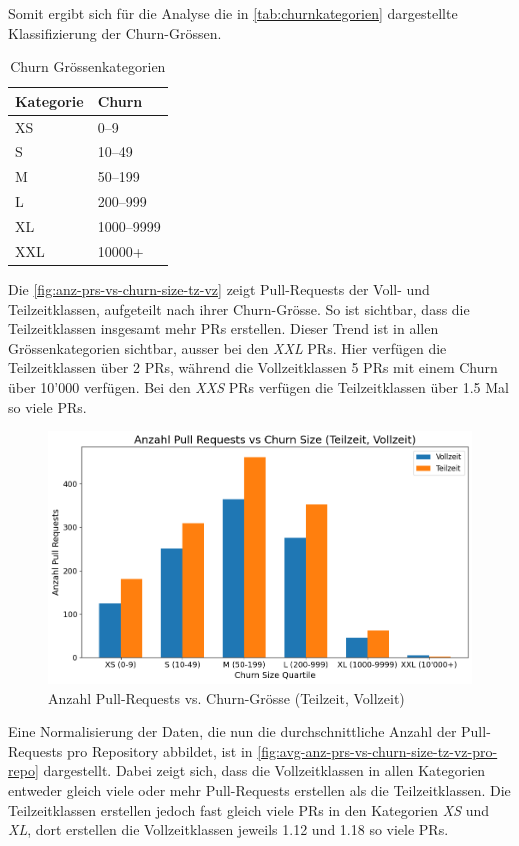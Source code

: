 \newpage
Somit ergibt sich für die Analyse die in \autoref{tab:churnkategorien} dargestellte Klassifizierung der Churn-Grössen.
\begin{table}[ht]
\caption{Churn Grössenkategorien}
\label{tab:churnkategorien}
\centering
\begin{tabular}{l l}
\toprule
\textbf{Kategorie} & \textbf{Churn} \\
\midrule
XS  & 0--9       \\
S        & 10--49     \\
M        & 50--199    \\
L         & 200--999   \\
XL   & 1000--9999 \\
XXL  & 10000+ \\
\bottomrule
\end{tabular}
\end{table}


Die \autoref{fig:anz-prs-vs-churn-size-tz-vz} zeigt Pull-Requests der Voll- und Teilzeitklassen, aufgeteilt nach ihrer Churn-Grösse. So ist sichtbar, dass die Teilzeitklassen insgesamt mehr PRs erstellen. Dieser Trend ist in allen Grössenkategorien sichtbar, ausser bei den \textit{XXL} PRs. Hier verfügen die Teilzeitklassen  über 2 PRs, während die Vollzeitklassen 5 PRs mit einem Churn über 10'000 verfügen. Bei den \textit{XXS} PRs verfügen die Teilzeitklassen über 1.5 Mal so viele PRs.

\begin{figure}[htbp]
    \includegraphics[width=\textwidth]{Figures/anz-prs-vs-churn-size-tz-vz.png}
    \caption{Anzahl Pull-Requests vs. Churn-Grösse (Teilzeit, Vollzeit)}
    \label{fig:anz-prs-vs-churn-size-tz-vz}
\end{figure}
\newpage
Eine Normalisierung der Daten, die nun die durchschnittliche Anzahl der Pull-Requests pro Repository abbildet, ist in \autoref{fig:avg-anz-prs-vs-churn-size-tz-vz-pro-repo} dargestellt. Dabei zeigt sich, dass die Vollzeitklassen in allen Kategorien entweder gleich viele oder mehr Pull-Requests erstellen als die Teilzeitklassen. Die Teilzeitklassen erstellen jedoch fast gleich viele PRs in den Kategorien \textit{XS} und \textit{XL}, dort erstellen die Vollzeitklassen jeweils 1.12 und 1.18 so viele PRs. 


